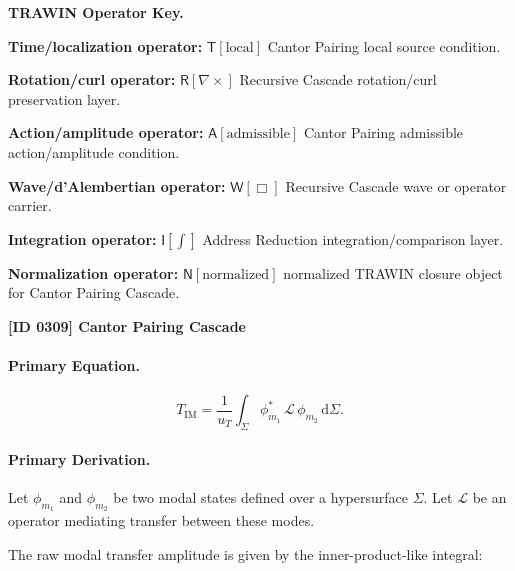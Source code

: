 \par\vspace{0.45\baselineskip}
\noindent\begin{minipage}[t]{\linewidth}
\begingroup
\small
\raggedright
\textbf{TRAWIN Operator Key.}\par
\noindent\textbf{Time/localization operator:} $\mathsf{T}\!\left[\mathrm{local}\right]$ Cantor Pairing local source condition.\par
\noindent\textbf{Rotation/curl operator:} $\mathsf{R}\!\left[\nabla\times\right]$ Recursive Cascade rotation/curl preservation layer.\par
\noindent\textbf{Action/amplitude operator:} $\mathsf{A}\!\left[\mathrm{admissible}\right]$ Cantor Pairing admissible action/amplitude condition.\par
\noindent\textbf{Wave/d'Alembertian operator:} $\mathsf{W}\!\left[\Box\right]$ Recursive Cascade wave or operator carrier.\par
\noindent\textbf{Integration operator:} $\mathsf{I}\!\left[\int\right]$ Address Reduction integration/comparison layer.\par
\noindent\textbf{Normalization operator:} $\mathsf{N}\!\left[\mathrm{normalized}\right]$ normalized TRAWIN closure object for Cantor Pairing Cascade.\par
\endgroup
\end{minipage}

\clearpage
\noindent\textbf{[ID 0309] Cantor Pairing Cascade}\par
\vspace{0.35em}
\paragraph{Primary Equation.}
\begin{equation}
T_{\mathrm{IM}}
=
\frac{1}{u_T}
\int_{\Sigma}
\phi_{m_1}^{*}
\,\mathcal{L}\,
\phi_{m_2}
\,\mathrm{d}\Sigma .
\end{equation}

\paragraph{Primary Derivation.}
Let $\phi_{m_1}$ and $\phi_{m_2}$ be two modal states defined over a hypersurface $\Sigma$.  
Let $\mathcal{L}$ be an operator mediating transfer between these modes.

The raw modal transfer amplitude is given by the inner-product-like integral:

